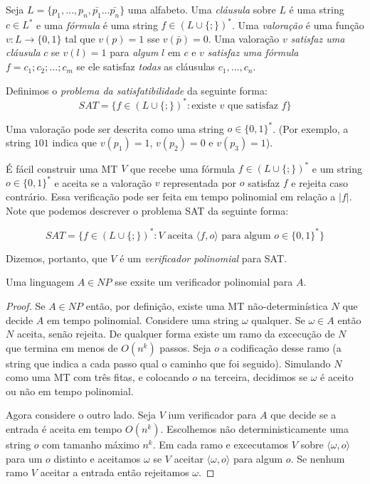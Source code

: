 \begin{example}
  Seja $L = \{p_1, \dots, p_n, \bar{p_1} \dots \bar{p_n}\}$ uma alfabeto.
  Uma {\em cláusula} sobre $L$ é uma string $c \in L^*$ e uma {\em fórmula} é uma string $f \in (L\cup\{;\})^*$.
  Uma {\em valoração} é uma função $v : L \to \{0,1\}$ tal que $v(p) = 1$ sse $v(\bar{p}) = 0$.
  Uma valoração $v$ {\em satisfaz uma cláusula} $c$ se $v(l) = 1$ para {\em algum} $l$ em $c$ e $v$ {\em satisfaz uma fórmula} $f = c_1;c_2;\dots;c_m$ se ele satisfaz {\em todas} as cláusulas $c_1, \dots, c_n$.

  Definimos o {\em problema da satisfatibilidade} da seguinte forma:
  \begin{displaymath}
    SAT = \{f \in (L \cup \{;\})^*: \textrm{existe $v$ que satisfaz $f$}\}
  \end{displaymath}

  Uma valoração pode ser descrita como uma string $o \in \{0,1\}^*$.
  (Por exemplo, a string $101$ indica que $v(p_1) = 1$, $v(p_2) = 0$ e $v(p_3) = 1$).

  É fácil construir uma MT $V$ que recebe uma fórmula $f \in (L \cup \{;\})^*$ e um string $o \in \{0,1\}^*$ e aceita se a valoração $v$ representada por $o$ satisfaz $f$ e rejeita caso contrário.
  Essa verificação pode ser feita em tempo polinomial em relação a $|f|$.
  Note que podemos descrever o problema SAT da seguinte forma:

  \begin{displaymath}
    SAT = \{f \in (L \cup \{;\})^*: \textrm{$V$ aceita $\langle f, o \rangle$ para algum $o \in \{0,1\}^*$}\}
  \end{displaymath}

  Dizemos, portanto, que $V$ é um {\em verificador polinomial} para SAT.
\end{example}

\begin{theorem}
  Uma linguagem $A \in NP$ sse exsite um verificador polinomial para $A$.
\end{theorem}
\begin{proof}
  Se $A \in NP$ então, por definição, existe uma MT não-determinística $N$ que decide $A$ em tempo polinomial.
  Considere uma string $\omega$ qualquer.
  Se $\omega \in A$ então $N$ aceita, senão rejeita.
  De qualquer forma existe um ramo da excecução de $N$ que termina em menos de $O(n^k)$ passos.
  Seja $o$ a codificação desse ramo (a string que indica a cada passo qual o caminho que foi seguido).
  Simulando $N$ como uma MT com três fitas, e colocando $o$ na terceira, decidimos se $\omega$ é aceito ou não em tempo polinomial.

  Agora considere o outro lado.
  Seja $V$ ium verificador para $A$ que decide se a entrada é aceita em tempo $O(n^k)$.
  Escolhemos não deterministicamente uma string $o$ com tamanho máximo $n^k$.
  Em cada ramo e excecutamos $V$ sobre $\langle \omega, o \rangle$ para um $o$ distinto e aceitamos $\omega$ se $V$ aceitar $\langle \omega, o \rangle$ para algum $o$.
  Se nenhum ramo $V$ aceitar a entrada então rejeitamos $\omega$.
\end{proof}

